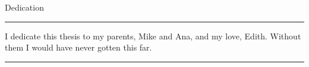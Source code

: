 \begin{vcenterpage}
{\LARGE{\sc Dedication}}

\noindent\rule[2pt]{\textwidth}{0.5pt}

I dedicate this thesis to my parents, Mike and Ana, and my love, Edith. Without them I would have never gotten this far.

\noindent\rule[2pt]{\textwidth}{0.5pt}
\end{vcenterpage}
